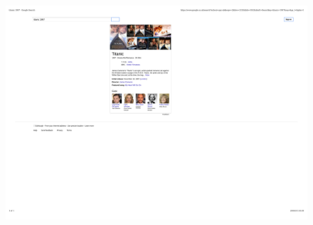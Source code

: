 \documentclass[mathserif,12pt]{beamer}
\begin{document}
\begin{frame}
\begin{columns}
 \begin{column}{0.45\textwidth}
 \vspace{-0.5cm}
 \begin{figure}
  \includegraphics[scale=0.45]{figures/titanic} 
 \end{figure}
 \end{column}
\end{columns}
\end{frame}
\end{document}
